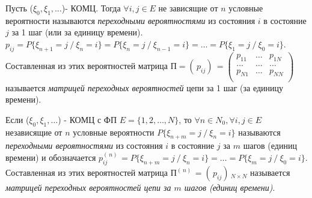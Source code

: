 \begin{defs}
  Пусть ($\xi_0, \xi_1, \ldots$)- КОМЦ. Тогда $\forall i,j \in E$ не зависящие от $n$ условные вероятности называются
  \textit{переходными вероятностями} из состояния $i$ в состояние $j$ за 1 шаг (или за единицу времени).
  $p_{ij} = P\{\xi_{n+1}=j \ / \ \xi_n=i\} = P\{\xi_{n}=j \ / \ \xi_{n-1}=i\} = \ldots = P\{\xi_1=j \ / \ \xi_0=i\}$.
  Составленная из этих вероятностей матрица $\text{П} = ( \,p_{ij}) \, =
  \begin{pmatrix}
    p_{11} & \ldots & p_{1N} \\
    \ldots & \ldots & \ldots \\
    p_{N1} & \ldots & p_{NN} \\
  \end{pmatrix}$ называется \textit{матрицей переходных вероятностей} цепи за 1 шаг (за единицу времени).
\end{defs}

\begin{defs}
  Если ($\xi_0, \xi_1, \ldots$) - КОМЦ с ФП $E = \{1,2,\ldots,N\}$, то $\forall n \in N_0, \forall i,j \in E$ независящие от $n$ условные вероятности
  $P\{\xi_{n+m}=j \ / \ \xi_n=i\}$ называются \textit{переходными вероятностями} из состояния $i$ в состояние $j$ за $m$ шагов (единиц времени)
  и обозначается $p_{ij}^{( \,n) \,} = P\{\xi_{n+m}=j \ / \ \xi_n=i\} = \ldots = P\{\xi_m=j \ / \ \xi_0=i\}$.
  Составленная из этих вероятностей матрица $\text{П}^{( \,n) \,} = ( \,p_{ij}) \,_{N \times N}$
  называется \textit{матрицей переходных вероятностей цепи за $m$ шагов (единиц времени)}.
\end{defs}

